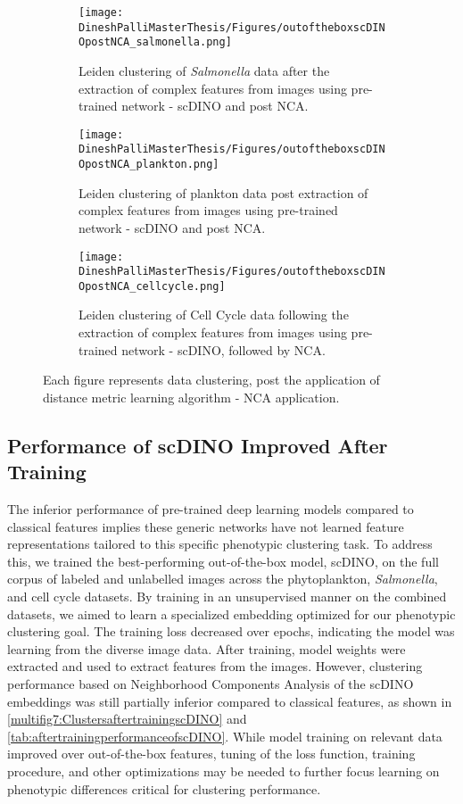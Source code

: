 \documentclass[12pt,a4paper]{article}
\begin{document}
\begin{figure}
  \centering
  \begin{subfigure}{\linewidth}
    \texttt{[image: DineshPalliMasterThesis/Figures/outoftheboxscDINOpostNCA\_salmonella.png]}
    \caption{Leiden clustering of \textit{Salmonella} data after the extraction of complex features from images using pre-trained network - scDINO and post NCA.}
    \label{multifig6:image_a}
  \end{subfigure}
  \hfill
  \begin{subfigure}{\linewidth}
    \texttt{[image: DineshPalliMasterThesis/Figures/outoftheboxscDINOpostNCA\_plankton.png]}
    \caption{Leiden clustering of plankton data post extraction of complex features from images using pre-trained network - scDINO and post NCA.}
    \label{multifig6:image_b}
  \end{subfigure}
  \hfill
  \begin{subfigure}{\linewidth}
    \texttt{[image: DineshPalliMasterThesis/Figures/outoftheboxscDINOpostNCA\_cellcycle.png]}
    \caption{Leiden clustering of Cell Cycle data following the extraction of complex features from images using pre-trained network - scDINO, followed by NCA.}
    \label{multifig6:image_c}
  \end{subfigure}
  \caption[Clustering on features extracted from the images using deep learning model scDINO, post DML - NCA]{Each figure represents data clustering, post the application of distance metric learning algorithm - NCA application.}
  \label{multifig6:Outoftheboxclusters}
\end{figure}


\subsection{Performance of scDINO Improved After Training}

The inferior performance of pre-trained deep learning models compared to classical features implies these generic networks have not learned feature representations tailored to this specific phenotypic clustering task. To address this, we trained the best-performing out-of-the-box model, scDINO, on the full corpus of labeled and unlabelled images across the phytoplankton, \textit{Salmonella}, and cell cycle datasets. By training in an unsupervised manner on the combined datasets, we aimed to learn a specialized embedding optimized for our phenotypic clustering goal. The training loss decreased over epochs, indicating the model was learning from the diverse image data. After training, model weights were extracted and used to extract features from the images. However, clustering performance based on Neighborhood Components Analysis of the scDINO embeddings was still partially inferior compared to classical features, as shown in \ref{multifig7:ClustersaftertrainingscDINO} and \ref{tab:aftertrainingperformanceofscDINO}. While model training on relevant data improved over out-of-the-box features, tuning of the loss function, training procedure, and other optimizations may be needed to further focus learning on phenotypic differences critical for clustering performance.
\end{document}
